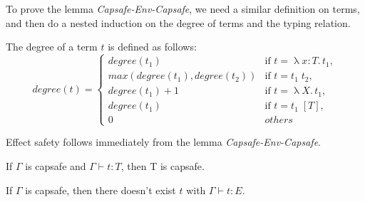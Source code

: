 To prove the lemma \emph{Capsafe-Env-Capsafe}, we need a similar
definition on terms, and then do a nested induction on the degree of
terms and the typing relation.

\begin{definition}
  The degree of a term $t$ is defined as follows:
  \begin{equation*}
    degree(t) =
    \begin{cases}
      degree(t_1) & \text{if } t = \uplambda x{:}T. \, t_1,\\
      max(degree(t_1), degree(t_2)) & \text{if } t = t_1 \; t_2,\\
      degree(t_1) + 1 & \text{if } t = \uplambda X. \, t_1,\\
      degree(t_1) & \text{if } t = t_1 \; [T],\\
      0 & others
    \end{cases}
  \end{equation*}
\end{definition}

Effect safety follows immediately from the lemma
\emph{Capsafe-Env-Capsafe}.

\begin{lemma}
  If $\Gamma$ is capsafe and $\Gamma \vdash t : T$, then T is capsafe.
\end{lemma}

\begin{theorem}
  If $\Gamma$ is capsafe, then there doesn't exist $t$ with
  $\Gamma \vdash t : E$.
\end{theorem}
